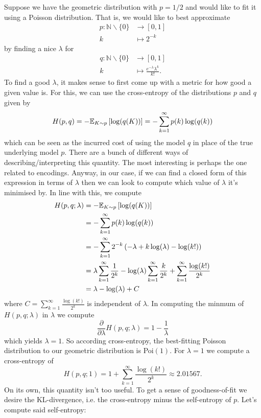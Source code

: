 \documentclass[11pt]{article}
\begin{document}
\begin{appendices}
Suppose we have the geometric distribution with $p=1/2$ and would like to fit it using a Poisson distribution. That is, we would like to best approximate
\begin{align*}
    p:\mathbb{N}\backslash\{0\}&\to[0,1]\\
    k&\mapsto2^{-k}
\end{align*}
by finding a nice $\lambda$ for
\begin{align*}
    q:\mathbb{N}\backslash\{0\}&\to[0,1]\\
    k&\mapsto\frac{e^{-\lambda}\lambda^k}{k!}.
\end{align*}
To find a good $\lambda$, it makes sense to first come up with a metric for how good a given value is. For this, we can use the cross-entropy of the distributions $p$ and $q$ given by
$$
H(p,q)
=
-\mathbb{E}_{K\sim p}\left[\log(q(K))\right]
=
-\sum_{k=1}^{\infty}p(k)\log(q(k))
$$
which can be seen as the incurred cost of using the model $q$ in place of the true underlying model $p$. There are a bunch of different ways of describing/interpreting this quantity. The most interesting is perhaps the one related to encodings. Anyway, in our case, if we can find a closed form of this expression in terms of $\lambda$ then we can look to compute which value of $\lambda$ it's minimised by. In line with this, we compute
\begin{align*}
    H(p,q;\lambda)
    &=
    -\mathbb{E}_{K\sim p}\left[\log(q(K))\right]\\
    &=
    -\sum_{k=1}^{\infty}p(k)\log(q(k))\\
    &=
    -\sum_{k=1}^{\infty}2^{-k}\left(-\lambda+k\log(\lambda)-\log(k!)\right)\\
    &=
    \lambda\sum_{k=1}^{\infty}\frac{1}{2^k}-\log(\lambda)\sum_{k=1}^{\infty}\frac{k}{2^k}+\sum_{k=1}^{\infty}\frac{\log(k!)}{2^k}\\
    &=
    \lambda-\log(\lambda)+C
\end{align*}
where $C=\sum_{k=1}^{\infty}\frac{\log(k!)}{2^k}$ is independent of $\lambda$. In computing the minmum of $H(p,q;\lambda)$ in $\lambda$ we compute
$$
\frac{\partial}{\partial \lambda}H(p,q;\lambda)
=
1-\frac{1}{\lambda}
$$
which yields $\lambda=1$. So according cross-entropy, the best-fitting Poisson distribution to our geometric distribution is Poi$(1)$. For $\lambda=1$ we compute a cross-entropy of
$$
H(p,q;1)
=
1+\sum_{k=1}^{\infty}\frac{\log(k!)}{2^k}
\approx
2.01567.
$$
On its own, this quantity isn't too useful. To get a sense of goodness-of-fit we desire the KL-divergence, i.e. the cross-entropy minus the self-entropy of $p$. Let's compute said self-entropy:

\end{appendices}
\end{document}
